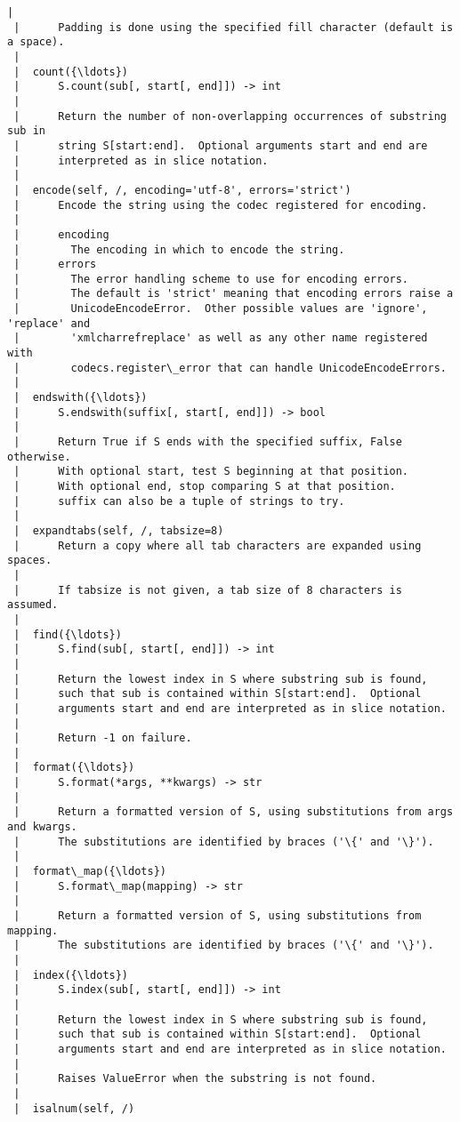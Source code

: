 \begin{Verbatim}[commandchars=\\\{\},frame=single,framerule=0.3mm,rulecolor=\color{cellframecolor}]
 |      
 |      Padding is done using the specified fill character (default is a space).
 |  
 |  count({\ldots})
 |      S.count(sub[, start[, end]]) -> int
 |      
 |      Return the number of non-overlapping occurrences of substring sub in
 |      string S[start:end].  Optional arguments start and end are
 |      interpreted as in slice notation.
 |  
 |  encode(self, /, encoding='utf-8', errors='strict')
 |      Encode the string using the codec registered for encoding.
 |      
 |      encoding
 |        The encoding in which to encode the string.
 |      errors
 |        The error handling scheme to use for encoding errors.
 |        The default is 'strict' meaning that encoding errors raise a
 |        UnicodeEncodeError.  Other possible values are 'ignore', 'replace' and
 |        'xmlcharrefreplace' as well as any other name registered with
 |        codecs.register\_error that can handle UnicodeEncodeErrors.
 |  
 |  endswith({\ldots})
 |      S.endswith(suffix[, start[, end]]) -> bool
 |      
 |      Return True if S ends with the specified suffix, False otherwise.
 |      With optional start, test S beginning at that position.
 |      With optional end, stop comparing S at that position.
 |      suffix can also be a tuple of strings to try.
 |  
 |  expandtabs(self, /, tabsize=8)
 |      Return a copy where all tab characters are expanded using spaces.
 |      
 |      If tabsize is not given, a tab size of 8 characters is assumed.
 |  
 |  find({\ldots})
 |      S.find(sub[, start[, end]]) -> int
 |      
 |      Return the lowest index in S where substring sub is found,
 |      such that sub is contained within S[start:end].  Optional
 |      arguments start and end are interpreted as in slice notation.
 |      
 |      Return -1 on failure.
 |  
 |  format({\ldots})
 |      S.format(*args, **kwargs) -> str
 |      
 |      Return a formatted version of S, using substitutions from args and kwargs.
 |      The substitutions are identified by braces ('\{' and '\}').
 |  
 |  format\_map({\ldots})
 |      S.format\_map(mapping) -> str
 |      
 |      Return a formatted version of S, using substitutions from mapping.
 |      The substitutions are identified by braces ('\{' and '\}').
 |  
 |  index({\ldots})
 |      S.index(sub[, start[, end]]) -> int
 |      
 |      Return the lowest index in S where substring sub is found, 
 |      such that sub is contained within S[start:end].  Optional
 |      arguments start and end are interpreted as in slice notation.
 |      
 |      Raises ValueError when the substring is not found.
 |  
 |  isalnum(self, /)

\end{Verbatim}
